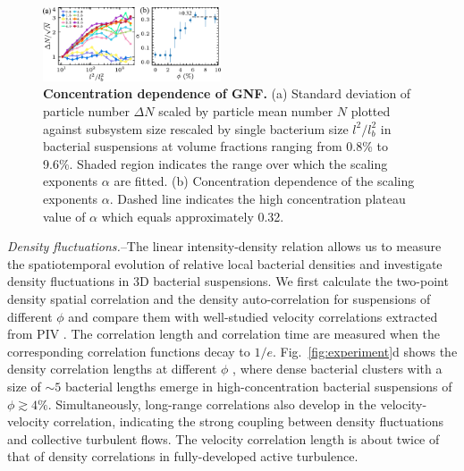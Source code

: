 \documentclass[twocolumn,aps,prl,amsmath,amssymb,longbibliography]{revtex4-2}
\begin{document}
\begin{figure}[ht]
\begin{center}
\includegraphics[width=0.47\textwidth]{figures/GNF/v1.pdf}
\caption[Concentration dependence of GNF.]
{
\textbf{Concentration dependence of GNF.}
(a) Standard deviation of particle number $\Delta N$ scaled by particle mean number $N$ plotted against subsystem size rescaled by single bacterium size $l^2/l_b^2$ in bacterial suspensions at volume fractions ranging from 0.8\% to 9.6\%. Shaded region indicates the range over which the scaling exponents $\alpha$ are fitted.
(b) Concentration dependence of the scaling exponents $\alpha$. Dashed line indicates the high concentration plateau value of $\alpha$ which equals approximately 0.32.
}
\label{fig:GNF}
\end{center}
\end{figure}


\textit{Density fluctuations.}--The linear intensity-density relation allows us to measure the spatiotemporal evolution of relative local bacterial densities and investigate density fluctuations in 3D bacterial suspensions. We first calculate the two-point density spatial correlation and the density auto-correlation for suspensions of different $\phi$ and compare them with well-studied velocity correlations extracted from PIV \cite{Liu2020}.
The correlation length and correlation time are measured when the corresponding correlation functions decay to $1/e$. Fig.~\ref{fig:experiment}d shows the density correlation lengths at different $\phi$
, where dense bacterial clusters with a size of $\sim 5$ bacterial lengths emerge in high-concentration bacterial suspensions of $\phi \gtrsim 4\%$.
Simultaneously, long-range correlations also develop in the velocity-velocity correlation, indicating the strong coupling between density fluctuations and collective turbulent flows. The velocity correlation length is about twice of that of density correlations in fully-developed active turbulence.
\end{document}
